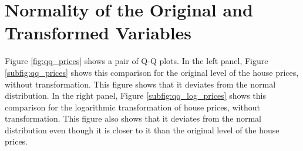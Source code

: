 %
%
%
%
%
%
%
%
%
%
%
%
\section*{Normality of the Original and Transformed Variables}

Figure \ref{fig:qq_prices} shows a pair of Q-Q plots.
In the left panel, Figure \ref{subfig:qq_prices} shows this comparison 
for the original level of the house prices, without transformation. 
This figure shows that it deviates from the normal distribution.
In the right panel, Figure \ref{subfig:qq_log_prices} shows this comparison 
for the logarithmic transformation of house prices, without transformation. 
This figure also shows that it deviates from the normal distribution even though it is closer to it than the original level of the house prices.


